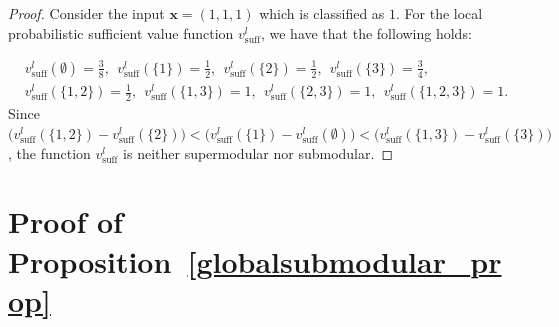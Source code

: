 \documentclass{article}
\newcommand{\x}{\textbf{x}}
\begin{document}
\begin{proof}
Consider the input $\x = (1,1,1)$ which is classified as $1$.
For the local probabilistic sufficient value function $v^{l}_{\text{suff}}$, we have that the following holds:

\begin{align*}
&v^{l}_{\text{suff}}(\emptyset) = \frac{3}{8},~~v^{l}_{\text{suff}}(\{1\}) = \frac{1}{2},~~v^{l}_{\text{suff}}(\{2\}) = \frac{1}{2},~~v^{l}_{\text{suff}}(\{3\}) = \frac{3}{4}, \\
&v^{l}_{\text{suff}}(\{1,2\}) = \frac{1}{2},~~v^{l}_{\text{suff}}(\{1,3\}) = 1,~~v^{l}_{\text{suff}}(\{2,3\}) = 1,~~v^{l}_{\text{suff}}(\{1,2,3\}) = 1.
\end{align*}
%
Since $\bigl(v^{l}_{\text{suff}}(\{1,2\}) - v^{l}_{\text{suff}}(\{2\})\bigr) < \bigl(v^{l}_{\text{suff}}(\{1\}) - v^{l}_{\text{suff}}(\emptyset)\bigr) < \bigl(v^{l}_{\text{suff}}(\{1,3\}) - v^{l}_{\text{suff}}(\{3\})\bigr)$,
the function $v^{l}_{\text{suff}}$ is neither supermodular nor submodular.
 
\end{proof}


\section{Proof of Proposition~\ref{globalsubmodular_prop}}
\label{globalsubmodular_prop_sec}

\globalsubmodular*
\end{document}
